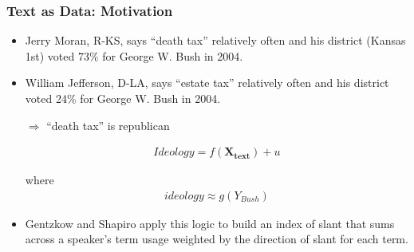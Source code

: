 \documentclass[
  shownotes,
  xcolor={svgnames},
  hyperref={colorlinks,citecolor=DarkBlue,linkcolor=DarkRed,urlcolor=DarkBlue}
  , aspectratio=169]{beamer}
\newcommand{\bm}[1]{\mathbf{#1}}
\begin{document}
\begin{frame}[fragile]
\frametitle{Text as Data: Motivation}

\begin{itemize} 
  \item Jerry Moran, R-KS, says ``death tax'' relatively often and his district (Kansas 1st) voted 73\% for George W. Bush in 2004.

  \item William Jefferson, D-LA, says ``estate tax'' relatively often and his district voted 24\% for George W. Bush in 2004.

\medskip

$\bm{\Rightarrow}$ ``death tax'' is republican



\begin{align}
Ideology = f(\bm{X_\text{text}}) + u
\end{align}

where 
\begin{align}
ideology \approx g(Y_{Bush})
\end{align}

\item Gentzkow and Shapiro apply this logic to build an index of slant that sums across a speaker’s term usage weighted by the direction of slant for each term. 

\end{itemize}


\end{frame}


\end{document}
